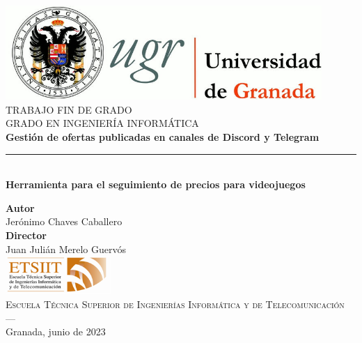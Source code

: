 \begin{titlepage}
\newlength{\centeroffset}
\setlength{\centeroffset}{-0.5\oddsidemargin}
\addtolength{\centeroffset}{0.5\evensidemargin}
\thispagestyle{empty}

\noindent\hspace*{\centeroffset}\begin{minipage}{\textwidth}

\centering
\includegraphics[width=0.9\textwidth]{logos/logo_ugr.jpg}\\[1.4cm]

\textsc{ \Large TRABAJO FIN DE GRADO\\[0.2cm]}
\textsc{ GRADO EN INGENIERÍA INFORMÁTICA}\\[1cm]

{\Huge\bfseries Gestión de ofertas publicadas en canales de Discord y Telegram \\}
\noindent\rule[-1ex]{\textwidth}{3pt}\\[3.5ex]
{\large\bfseries Herramienta para el seguimiento de precios para videojuegos }
\end{minipage}

\vspace{1.75cm}
\noindent\hspace*{\centeroffset}
\begin{minipage}{\textwidth}
\centering

\textbf{Autor}\\ {Jerónimo Chaves Caballero}\\[2.5ex]
\textbf{Director}\\ {Juan Julián Merelo Guervós}\\[1.75cm]
\includegraphics[width=0.3\textwidth]{logos/etsiit_logo.png}\\[0.1cm]
\textsc{Escuela Técnica Superior de Ingenierías Informática y de Telecomunicación}\\
\textsc{---}\\
Granada, junio de 2023
\end{minipage}
\end{titlepage}
